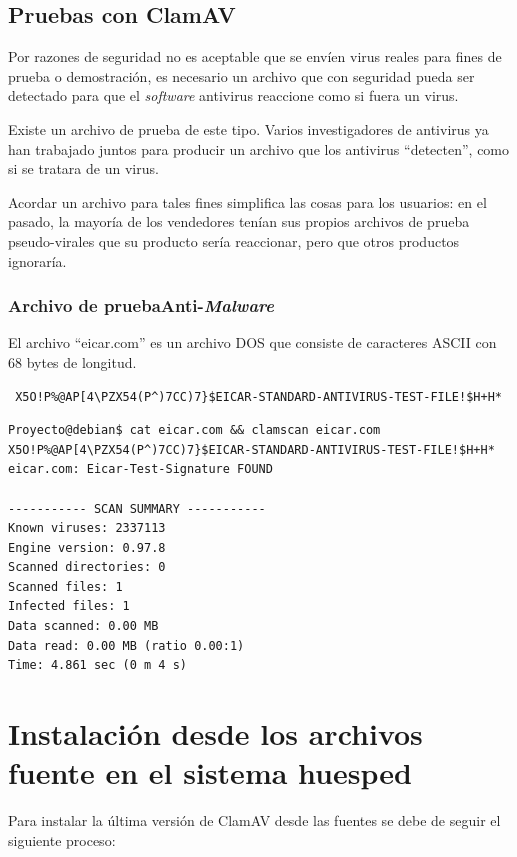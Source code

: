 \subsection{Pruebas con ClamAV}

Por razones de seguridad no es aceptable que se envíen  virus reales para 
fines de prueba o demostración, es necesario un archivo que con seguridad 
pueda ser detectado para que el \emph{software} antivirus reaccione como 
si fuera un virus.

Existe un archivo de prueba de este tipo. Varios investigadores de antivirus ya 
han trabajado juntos para producir un archivo que  los antivirus 
``detecten'', como si se tratara de un virus.

Acordar un archivo para tales fines simplifica las cosas para los usuarios: en 
el pasado, la mayoría de los vendedores tenían sus propios archivos de prueba 
pseudo-virales que su producto sería reaccionar, pero que otros productos 
ignoraría.

\subsubsection{Archivo de pruebaAnti-\emph{Malware}}

El archivo ``eicar.com'' es un archivo DOS que consiste de caracteres ASCII con 
68 bytes de longitud.

\begin{verbatim}
 X5O!P%@AP[4\PZX54(P^)7CC)7}$EICAR-STANDARD-ANTIVIRUS-TEST-FILE!$H+H*
\end{verbatim}

\begin{verbatim}
Proyecto@debian$ cat eicar.com && clamscan eicar.com 
X5O!P%@AP[4\PZX54(P^)7CC)7}$EICAR-STANDARD-ANTIVIRUS-TEST-FILE!$H+H*
eicar.com: Eicar-Test-Signature FOUND

----------- SCAN SUMMARY -----------
Known viruses: 2337113
Engine version: 0.97.8
Scanned directories: 0
Scanned files: 1
Infected files: 1
Data scanned: 0.00 MB
Data read: 0.00 MB (ratio 0.00:1)
Time: 4.861 sec (0 m 4 s)
\end{verbatim}

\section{Instalación desde los archivos fuente en el sistema  huesped}

Para instalar la \'ultima  versi\'on de ClamAV desde las fuentes se debe de 
seguir el siguiente proceso:

